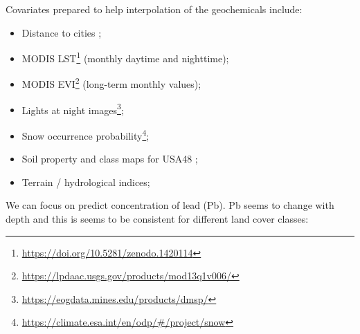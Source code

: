 \documentclass[
  graybox,natbib,nospthms]{svmono}
\newenvironment{Shaded}{\begin{snugshade}}{\end{snugshade}}
\newcommand{\AttributeTok}[1]{\textcolor[rgb]{0.61,0.61,0.61}{#1}}
\newcommand{\CommentTok}[1]{\textcolor[rgb]{0.37,0.37,0.37}{\textit{#1}}}
\newcommand{\ConstantTok}[1]{\textcolor[rgb]{0,0,0}{#1}}
\newcommand{\DecValTok}[1]{\textcolor[rgb]{0.06,0.06,0.06}{#1}}
\newcommand{\FunctionTok}[1]{\textcolor[rgb]{0,0,0}{#1}}
\newcommand{\NormalTok}[1]{#1}
\newcommand{\SpecialCharTok}[1]{\textcolor[rgb]{0,0,0}{#1}}
\newcommand{\StringTok}[1]{\textcolor[rgb]{0.5,0.5,0.5}{#1}}
\providecommand{\tightlist}{%
  \setlength{\itemsep}{0pt}\setlength{\parskip}{0pt}}
\providecommand{\tightlist}{\setlength{\itemsep}{0pt}\setlength{\parskip}{0pt}}
\renewcommand{\href}[2]{#2 (\url{#1})}
\renewcommand{\href}[2]{#2\footnote{\url{#1}}}
\begin{document}
Covariates prepared to help interpolation of the geochemicals include:

\begin{itemize}
\tightlist
\item
  Distance to cities \citep{nelson2019suite};\\
\item
  \href{https://doi.org/10.5281/zenodo.1420114}{MODIS LST} (monthly daytime and nighttime);\\
\item
  \href{https://lpdaac.usgs.gov/products/mod13q1v006/}{MODIS EVI} (long-term monthly values);\\
\item
  \href{https://eogdata.mines.edu/products/dmsp/}{Lights at night images};\\
\item
  \href{https://climate.esa.int/en/odp/\#/project/snow}{Snow occurrence probability};\\
\item
  Soil property and class maps for USA48 \citep{ramcharan2018soil};\\
\item
  Terrain / hydrological indices;
\end{itemize}

We can focus on predict concentration of lead (Pb). Pb seems to change
with depth and this is seems to be consistent for different land cover classes:

\begin{Shaded}
\end{Shaded}
\end{document}
